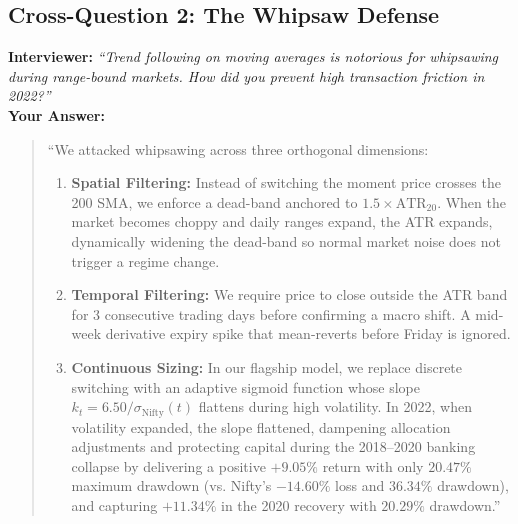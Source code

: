 \documentclass[11pt,a4paper]{article}
\begin{document}
\subsection{Cross-Question 2: The Whipsaw Defense}
\textbf{Interviewer:} \textit{``Trend following on moving averages is notorious for whipsawing during range-bound markets. How did you prevent high transaction friction in 2022?''} \\
\textbf{Your Answer:}
\begin{quote}
``We attacked whipsawing across three orthogonal dimensions:
\begin{enumerate}
    \item \textbf{Spatial Filtering:} Instead of switching the moment price crosses the 200 SMA, we enforce a dead-band anchored to $1.5 \times \text{ATR}_{20}$. When the market becomes choppy and daily ranges expand, the ATR expands, dynamically widening the dead-band so normal market noise does not trigger a regime change.
    \item \textbf{Temporal Filtering:} We require price to close outside the ATR band for 3 consecutive trading days before confirming a macro shift. A mid-week derivative expiry spike that mean-reverts before Friday is ignored.
    \item \textbf{Continuous Sizing:} In our flagship model, we replace discrete switching with an adaptive sigmoid function whose slope $k_t = 6.50 / \sigma_{\text{Nifty}}(t)$ flattens during high volatility. In 2022, when volatility expanded, the slope flattened, dampening allocation adjustments and protecting capital during the 2018--2020 banking collapse by delivering a positive $+9.05\%$ return with only $20.47\%$ maximum drawdown (vs. Nifty's $-14.60\%$ loss and $36.34\%$ drawdown), and capturing $+11.34\%$ in the 2020 recovery with $20.29\%$ drawdown.''
\end{enumerate}
\end{quote}
\end{document}
